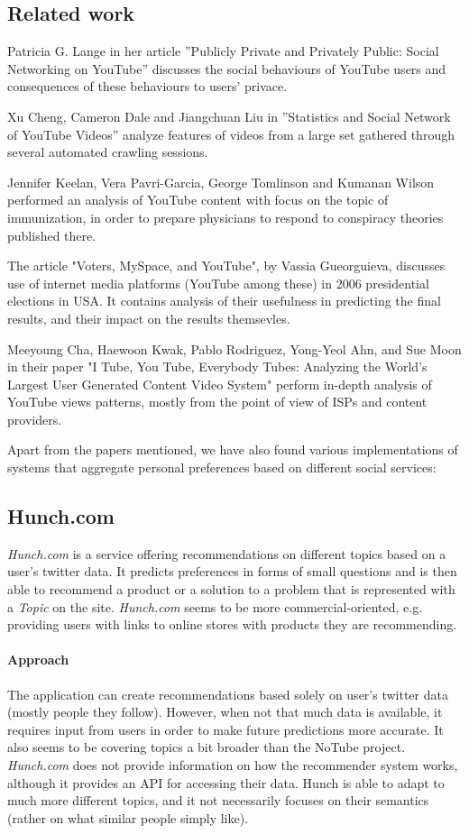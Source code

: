 \subsection{Related work}
Patricia G. Lange in her article ''Publicly Private and Privately Public: Social
Networking on YouTube'' discusses the social behaviours of YouTube users and
consequences of these behaviours to users' privace.

Xu Cheng, Cameron Dale and Jiangchuan Liu in ''Statistics and Social Network of
YouTube Videos'' analyze features of videos from a large set gathered through
several automated crawling sessions.

Jennifer Keelan, Vera Pavri-Garcia, George Tomlinson and Kumanan Wilson
performed an analysis of YouTube content with focus on the topic of
immunization, in order to prepare physicians to respond to conspiracy theories
published there.

The article "Voters, MySpace, and YouTube", by Vassia Gueorguieva, discusses use
of internet media platforms (YouTube among these) in 2006 presidential elections
in USA. It contains analysis of their usefulness in predicting the final
results, and their impact on the results themsevles.

Meeyoung Cha, Haewoon Kwak, Pablo Rodriguez, Yong-Yeol Ahn, and Sue Moon in
their paper "I Tube, You Tube, Everybody Tubes: Analyzing the World’s Largest
User Generated Content Video System" perform in-depth analysis of YouTube views
patterns, mostly from the point of view of ISPs and content providers.

Apart from the papers mentioned, we have also found various implementations of systems that aggregate personal preferences based on different
social services:

\subsection{Hunch.com}
\textit{Hunch.com} is a service offering recommendations on different topics based on a user's twitter data. It predicts preferences in forms of small questions and is then able to recommend a product or a solution to a problem that is represented with a \textit{Topic} on the site. \textit{Hunch.com} seems to be more commercial-oriented, e.g. providing users with links to online stores with products they are recommending.

\paragraph{Approach}
The application can create recommendations based solely on user's twitter data (mostly people they follow). However, when not that much data is available, it requires input from users in order to make future predictions more accurate. It also seems to be covering topics a bit broader than the NoTube project.
\textit{Hunch.com} does not provide information on how the recommender system works, although it provides an API for accessing their data.
Hunch is able to adapt to much more different topics, and it not necessarily focuses on their semantics (rather on what similar people simply like).

